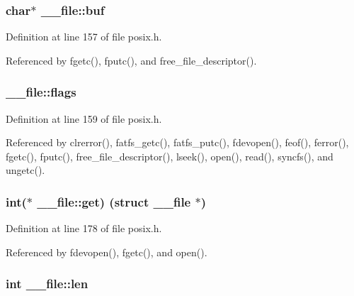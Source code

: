 \subsubsection[{\texorpdfstring{buf}{buf}}]{\setlength{\rightskip}{0pt plus 5cm}char$\ast$ \+\_\+\+\_\+file\+::buf}\hypertarget{struct____file_a3e5a85ae919a90efbb7cb44ccb54fe46}{}\label{struct____file_a3e5a85ae919a90efbb7cb44ccb54fe46}


Definition at line 157 of file posix.\+h.



Referenced by fgetc(), fputc(), and free\+\_\+file\+\_\+descriptor().

\subsubsection[{\texorpdfstring{flags}{flags}}]{ \+\_\+\+\_\+file\+::flags}\hypertarget{struct____file_a8d11df8679502efee09740f97d7c277b}{}\label{struct____file_a8d11df8679502efee09740f97d7c277b}


Definition at line 159 of file posix.\+h.



Referenced by clrerror(), fatfs\+\_\+getc(), fatfs\+\_\+putc(), fdevopen(), feof(), ferror(), fgetc(), fputc(), free\+\_\+file\+\_\+descriptor(), lseek(), open(), read(), syncfs(), and ungetc().

\subsubsection[{\texorpdfstring{get}{get}}]{\setlength{\rightskip}{0pt plus 5cm}int($\ast$ \+\_\+\+\_\+file\+::get) (struct {\bf \+\_\+\+\_\+file} $\ast$)}\hypertarget{struct____file_a2d816b077c3af0425344fe4b283dad33}{}\label{struct____file_a2d816b077c3af0425344fe4b283dad33}


Definition at line 178 of file posix.\+h.



Referenced by fdevopen(), fgetc(), and open().

\subsubsection[{\texorpdfstring{len}{len}}]{\setlength{\rightskip}{0pt plus 5cm}int \+\_\+\+\_\+file\+::len}\hypertarget{struct____file_a30309efd13a75ed510bb2370debafaf8}{}\label{struct____file_a30309efd13a75ed510bb2370debafaf8}


